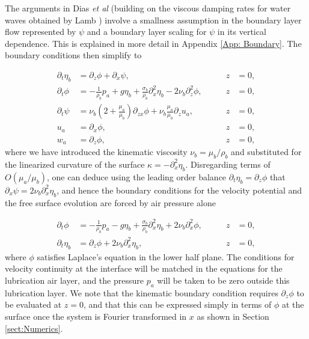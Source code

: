 The arguments in Dias \textit{et al} \cite{dias2008theory} (building on the viscous damping rates for water waves obtained by Lamb \cite{lamb1924hydrodynamics}) involve a smallness assumption in the boundary layer flow represented by $\psi$ and a boundary layer scaling for $\psi$ in its vertical dependence. This is explained in more detail in Appendix \ref{App: Boundary}. The boundary conditions then simplify to

\begin{align}
\partial_t \eta_b  &= \partial_z \phi + \partial_x \psi , \qquad &z&=0,  \\
\partial_t \phi &=  - \frac{1}{\rho_b} p_a + g \eta_b + \frac{\sigma_b}{\rho_b} \partial_x^2 \eta_{b} - 2\nu_b \partial_z^2 \phi, \qquad &z&=0, \\
    \partial_t \psi &=  \nu_b \left(2+\frac{\mu_a}{ \mu_b}\right) \partial_{zx} \phi + \nu_b \frac{\mu_a}{\mu_b}\partial_z u_a , \qquad &z&=0, \\
   u_a &= \partial_{x} \phi, \qquad &z&=0, \\
    w_a &= \partial_{z} \phi, \qquad &z&=0,
\end{align}
where we have introduced  the kinematic viscosity $\nu_b = \mu_b/\rho_b$ and substituted for the linearized curvature of the surface $\kappa = -\partial_x^2 \eta_b$. Disregarding terms of $O({\mu_a}/{\mu_b})$, one can deduce using the leading order balance $\partial_t \eta_b = \partial_z \phi$ that $\partial_x \psi = 2\nu_b \partial_{x}^2 \eta_b$, and hence the boundary conditions for the velocity potential and the free surface evolution are forced by air pressure alone

\begin{align}
\partial_t \phi &= -\frac{1}{\rho_b} p_a -  g\eta_b + \frac{\sigma_b}{\rho_b}\partial_x^2 \eta_b  + 2\nu_b \partial_x^2 \phi, \qquad &z&=0, \label{eq: qp DBC} \\
\partial_t \eta_b  &= \partial_z \phi + 2\nu_b \partial_x^2 \eta_b, \qquad &z&=0, \label{eq: qp KBC}
\end{align}
where $\phi$ satisfies Laplace's equation in the lower half plane. The conditions for velocity continuity at the interface will be matched in the equations for the lubrication air layer, and the pressure $p_a$ will be taken to be zero outside this lubrication layer. We note that the kinematic boundary condition requires $\partial_z \phi$ to be evaluated at $z=0$, and that this can be expressed simply in terms of $\phi$ at the surface once the system is Fourier transformed in $x$ as shown in Section \ref{sect:Numerics}.
